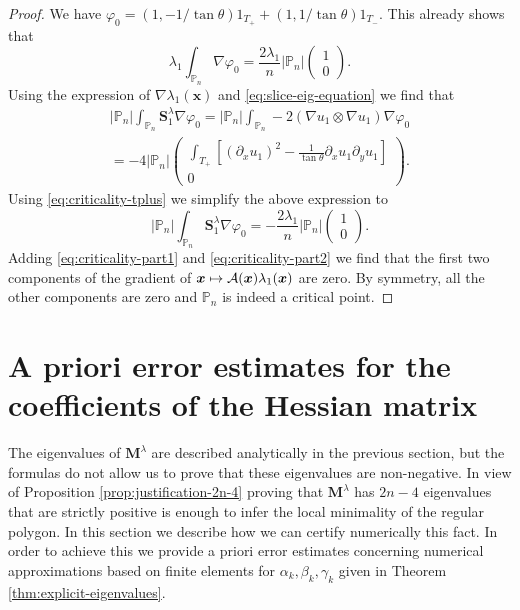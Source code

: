 \documentclass[11pt]{article}
\numberwithin{equation}{section}\newtheorem*{jepEnonce}{\jepEnonceTitle}\newenvironment{enonce*}[1]{\def\jepEnonceTitle{#1}\jepEnonce}{\endjepEnonce}\newtheorem*{conj*}{Conjecture}
\def\mto{\mathchoice{\longmapsto}{\mapsto}{\mapsto}{\mapsto}}
\theoremstyle{plain}
\theoremstyle{definition}
\newcommand{\bo}[1]{{\boldsymbol#1}}
\let\Bbb\mathbb
\begin{document}
\begin{proof}
We have $\varphi_0 = (1,-1/\tan\theta)1_{T_+}+(1,1/\tan\theta)1_{T_-}$. This already shows that
\begin{equation}\lambda_1 \int_{\Bbb P_n} \nabla \varphi_0 = \frac{2\lambda_1}{n} |\Bbb P_n| \begin{pmatrix}
1\\ 0
\end{pmatrix}.
\label{eq:criticality-part1}
\end{equation}
Using the expression of $\nabla \lambda_1(\bo x)$ and \eqref{eq:slice-eig-equation} we find that
\vspace*{-5pt}
\begin{multline*}
|\Bbb P_n| \int_{\Bbb P_n} \bo S_1^\lambda \nabla \varphi_0 = |\Bbb P_n| \int_{\Bbb P_n} -2(\nabla u_1\otimes \nabla u_1)\nabla \varphi_0 \\
= -4|\Bbb P_n| \begin{pmatrix}
\int_{T_+} [(\partial_x u_1)^2-\frac{1}{\tan \theta} \partial_x u_1 \partial_y u_1]\\
0
\end{pmatrix}.
\end{multline*}
Using \eqref{eq:criticality-tplus} we simplify the above expression to
\begin{equation} |\Bbb P_n| \int_{\Bbb P_n} \bo S_1^\lambda \nabla \varphi_0 = -\frac{2\lambda_1}{n}|\Bbb P_n| \begin{pmatrix} 1\\ 0
\end{pmatrix}.
\label{eq:criticality-part2}
\end{equation}
Adding \eqref{eq:criticality-part1} and \eqref{eq:criticality-part2} we find that the first two components of the gradient of $\bo x \mto \mathcal A(\bo x)\lambda_1(\bo x)$ are zero. By symmetry, all the other components are zero and $\Bbb P_n$ is indeed a critical point.
\end{proof}

\section{A priori error estimates for the coefficients of the Hessian matrix}\label{bobu200.s5}

The eigenvalues of $\bo M^\lambda$ are described analytically in the previous section, but the formulas do not allow us to prove that these eigenvalues are non-negative. In view of Proposition \ref{prop:justification-2n-4} proving that $\bo M^\lambda$ has $2n-4$ eigenvalues that are strictly positive is enough to infer the local minimality of the regular polygon. In this section we describe how we can certify numerically this fact. In order to achieve this we provide a priori error estimates concerning numerical approximations based on finite elements for $\alpha_k,\beta_k,\gamma_k$ given in Theorem \ref{thm:explicit-eigenvalues}.
\end{document}
